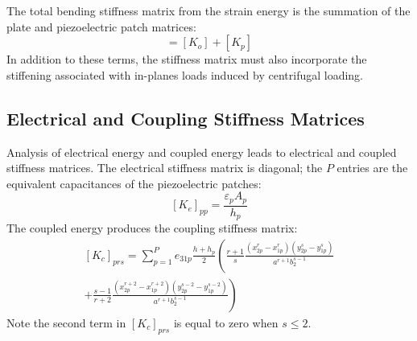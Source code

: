 \documentclass{article}
\begin{document}
\begin{body}
The total bending stiffness matrix from the strain energy is the summation of the plate and piezoelectric patch matrices:
\begin{equation}
[K]=[K_o]+[K_p]
\end{equation}
In addition to these terms, the stiffness matrix must also incorporate the stiffening associated with in-planes loads induced by centrifugal loading. 



\subsection{Electrical and Coupling Stiffness Matrices}
Analysis of electrical energy and coupled energy leads to electrical and coupled stiffness matrices. The electrical stiffness matrix is diagonal; the $P$ entries are the equivalent capacitances of the piezoelectric patches:
\begin{equation}\label{ElectricalStiffness}
[K_e]_{pp}=\frac{\varepsilon_p A_p}{h_p}
\end{equation}
The coupled energy produces the coupling stiffness matrix:
\begin{equation}\label{CoupledStiffness}
\begin{split}
[K_c]_{prs}=\sum_{p=1}^P e_{31p} \frac{h+h_p}{2} \left(\frac{r+1}{s} \frac{(x_{2p}^r-x_{1p}^r)(y_{2p}^s-y_{1p}^s)}{a^{r+1}b_2^{s-1}}\right. \\
\left. +\frac{s-1}{r+2} \frac{(x_{2p}^{r+2}-x_{1p}^{r+2})(y_{2p}^{s-2}-y_{1p}^{s-2})}{a^{r+1}b_2^{s-1}}\right)
\end{split}
\end{equation}
Note the second term in $[K_c]_{prs}$ is equal to zero when $s \leq 2$.





\end{body}
\end{document}
